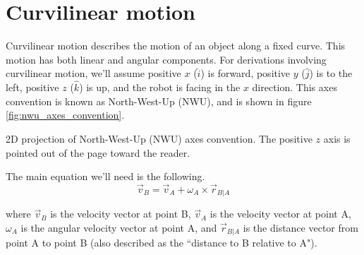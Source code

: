 \section{Curvilinear motion}

Curvilinear motion describes the motion of an object along a fixed curve. This
motion has both linear and angular components. For derivations involving
curvilinear motion, we'll assume positive $x$ ($\hat{i}$) is forward, positive
$y$ ($\hat{j}$) is to the left, positive $z$ ($\hat{k}$) is up, and the robot is
facing in the $x$ direction. This axes convention is known as North-West-Up
(NWU), and is shown in figure \ref{fig:nwu_axes_convention}.
\begin{bookfigure}

  \caption{2D projection of North-West-Up (NWU) axes convention. The positive
    $z$ axis is pointed out of the page toward the reader.}
  \label{fig:nwu_axes_convention}
\end{bookfigure}

The main equation we'll need is the following.
\begin{equation*}
  \vec{v}_B = \vec{v}_A + \omega_A \times \vec{r}_{B|A}
\end{equation*}

where $\vec{v}_B$ is the velocity vector at point B, $\vec{v}_A$ is the velocity
vector at point A, $\omega_A$ is the angular velocity vector at point A, and
$\vec{r}_{B|A}$ is the distance vector from point A to point B (also described
as the ``distance to B relative to A").
